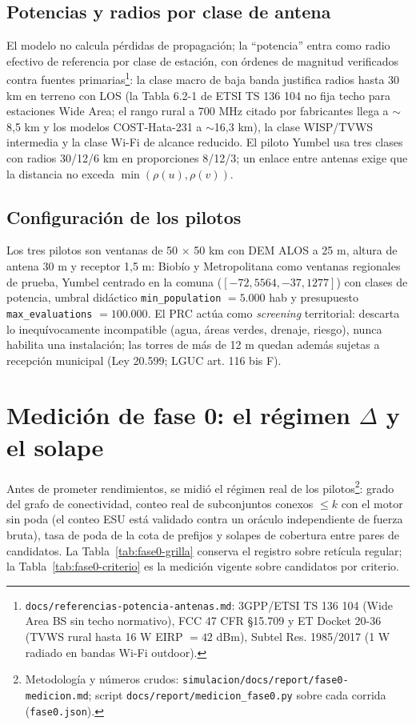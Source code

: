 \documentclass[12pt,letterpaper]{article}
\begin{document}
\subsection{Potencias y radios por clase de antena}
\label{sec:potencia}
El modelo no calcula pérdidas de propagación; la ``potencia'' entra como radio efectivo de referencia por clase de estación, con órdenes de magnitud verificados contra fuentes primarias\footnote{\texttt{docs/referencias-potencia-antenas.md}: 3GPP/ETSI TS 136 104 (Wide Area BS sin techo normativo), FCC 47 CFR §15.709 y ET Docket 20-36 (TVWS rural hasta 16 W EIRP $= 42$ dBm), Subtel Res. 1985/2017 (1 W radiado en bandas Wi-Fi outdoor).}: la clase macro de baja banda justifica radios hasta 30 km en terreno con LOS (la Tabla 6.2-1 de ETSI TS 136 104 no fija techo para estaciones Wide Area; el rango rural a 700 MHz citado por fabricantes llega a $\sim$8,5 km y los modelos COST-Hata-231 a $\sim$16,3 km), la clase WISP/TVWS intermedia y la clase Wi-Fi de alcance reducido. El piloto Yumbel usa tres clases con radios 30/12/6 km en proporciones 8/12/3; un enlace entre antenas exige que la distancia no exceda $\min(\rho(u), \rho(v))$.

\subsection{Configuración de los pilotos}
Los tres pilotos son ventanas de 50 $\times$ 50 km con DEM ALOS a 25 m, altura de antena 30 m y receptor 1,5 m: Biobío y Metropolitana como ventanas regionales de prueba, Yumbel centrado en la comuna ($[-72{,}5564, -37{,}1277]$) con clases de potencia, umbral didáctico \texttt{min\_population} $= 5.000$ hab y presupuesto \texttt{max\_evaluations} $= 100.000$. El PRC actúa como \emph{screening} territorial: descarta lo inequívocamente incompatible (agua, áreas verdes, drenaje, riesgo), nunca habilita una instalación; las torres de más de 12 m quedan además sujetas a recepción municipal (Ley 20.599; LGUC art. 116 bis F).

\section{Medición de fase 0: el régimen $\Delta$ y el solape}
\label{sec:fase0}
Antes de prometer rendimientos, se midió el régimen real de los pilotos\footnote{Metodología y números crudos: \texttt{simulacion/docs/report/fase0-medicion.md}; script \texttt{docs/report/medicion\_fase0.py} sobre cada corrida (\texttt{fase0.json}).}: grado del grafo de conectividad, conteo real de subconjuntos conexos $\le k$ con el motor sin poda (el conteo ESU está validado contra un oráculo independiente de fuerza bruta), tasa de poda de la cota de prefijos y solapes de cobertura entre pares de candidatos. La Tabla~\ref{tab:fase0-grilla} conserva el registro sobre retícula regular; la Tabla~\ref{tab:fase0-criterio} es la medición vigente sobre candidatos por criterio.
\end{document}
